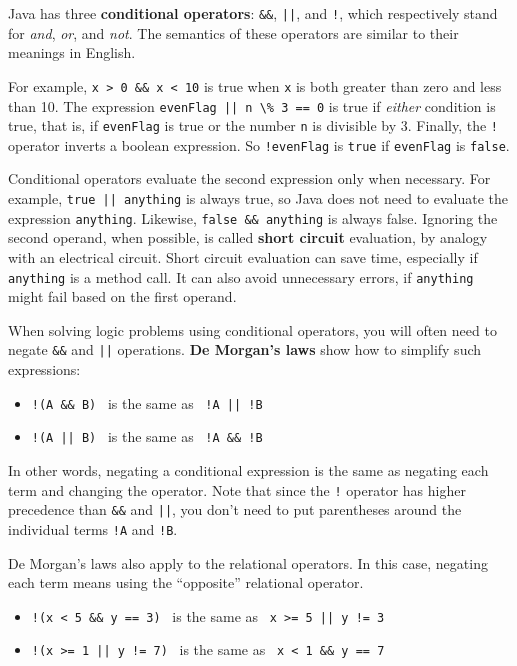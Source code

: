 \documentclass[12pt]{book}
\theoremstyle{exercise}
\newcommand{\java}[1]{\verb"#1"}
\newcommand{\java}[1]{\lstinline{#1}} %
\begin{document}
Java has three {\bf conditional operators}: \java{&&}, \java{||}, and \java{!}, which respectively stand for {\it and}, {\it or}, and {\it not}.
The semantics of these operators are similar to their meanings in English.

For example, \java{x > 0 && x < 10} is true when \java{x} is both greater than zero and less than 10.
The expression \java{evenFlag || n \% 3 == 0} is true if {\it either} condition is true, that is, if \java{evenFlag} is true or the number \java{n} is divisible by 3.
Finally, the \java{!} operator inverts a boolean expression.
So \java{!evenFlag} is \java{true} if \java{evenFlag} is \java{false}.


Conditional operators evaluate the second expression only when necessary.
For example, \java{true || anything} is always true, so Java does not need to evaluate the expression \java{anything}.
Likewise, \java{false && anything} is always false.
Ignoring the second operand, when possible, is called {\bf short circuit} evaluation, by analogy with an electrical circuit.
Short circuit evaluation can save time, especially if \java{anything} is a method call.
It can also avoid unnecessary errors, if \java{anything} might fail based on the first operand.


When solving logic problems using conditional operators, you will often need to negate \java{&&} and \java{||} operations.
{\bf De Morgan's laws} show how to simplify such expressions:

\begin{itemize}
\item \java{!(A && B)} ~is the same as~ \java{!A || !B}
\item \java{!(A || B)} ~is the same as~ \java{!A && !B}
\end{itemize}

In other words, negating a conditional expression is the same as negating each term and changing the operator.
Note that since the \java{!} operator has higher precedence than \java{&&} and \java{||}, you don't need to put parentheses around the individual terms \java{!A} and \java{!B}.

De Morgan's laws also apply to the relational operators.
In this case, negating each term means using the ``opposite'' relational operator.

\begin{itemize}
\item \java{!(x < 5 && y == 3)} ~is the same as~ \java{x >= 5 || y != 3}
\item \java{!(x >= 1 || y != 7)} ~is the same as~ \java{x < 1 && y == 7}
\end{itemize}
\end{document}
